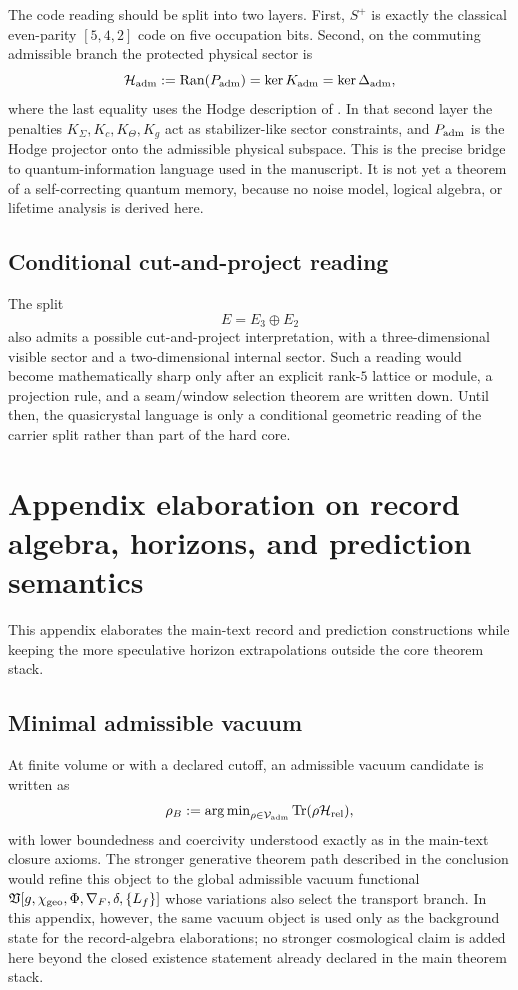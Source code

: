 \begin{remark}
The code reading should be split into two layers. First, $S^+$ is exactly the classical even-parity $[5,4,2]$ code on five occupation bits. Second, on the commuting admissible branch the protected physical sector is
\[
\mathcal H_{\mathrm{adm}}
:=
\operatorname{Ran}(P_{\mathrm{adm}})
=
\ker K_{\mathrm{adm}}
=
\ker \Delta_{\mathrm{adm}},
\]
where the last equality uses the Hodge description of . In that second layer the penalties $K_\Sigma,K_c,K_\Theta,K_g$ act as stabilizer-like sector constraints, and $P_{\mathrm{adm}}$ is the Hodge projector onto the admissible physical subspace. This is the precise bridge to quantum-information language used in the manuscript. It is not yet a theorem of a self-correcting quantum memory, because no noise model, logical algebra, or lifetime analysis is derived here.
\end{remark}

\subsection{Conditional cut-and-project reading}

The split
\[
E=E_3\oplus E_2
\]
also admits a possible cut-and-project interpretation, with a three-dimensional visible sector and a two-dimensional internal sector. Such a reading would become mathematically sharp only after an explicit rank-$5$ lattice or module, a projection rule, and a seam/window selection theorem are written down. Until then, the quasicrystal language is only a conditional geometric reading of the carrier split rather than part of the hard core.

\section{Appendix elaboration on record algebra, horizons, and prediction semantics}
\label{app:record}

This appendix elaborates the main-text record and prediction constructions while keeping the more speculative horizon extrapolations outside the core theorem stack.

\subsection{Minimal admissible vacuum}

At finite volume or with a declared cutoff, an admissible vacuum candidate is written as
\[
\rho_B
:=
\operatorname{arg\,min}_{\rho\in\mathcal V_{\mathrm{adm}}}\operatorname{Tr}(\rho\mathcal H_{\mathrm{rel}}),
\]
with lower boundedness and coercivity understood exactly as in the main-text closure axioms. The stronger generative theorem path described in the conclusion would refine this object to the global admissible vacuum functional $\mathfrak V[g,\chi_{\mathrm{geo}},\Phi,\nabla_F,\delta,\{L_f\}]$ whose variations also select the transport branch. In this appendix, however, the same vacuum object is used only as the background state for the record-algebra elaborations; no stronger cosmological claim is added here beyond the closed existence statement already declared in the main theorem stack.


